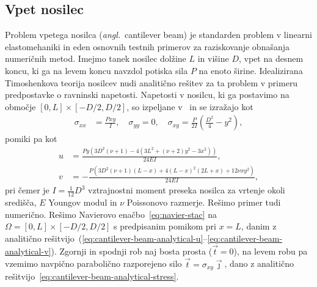\documentclass[12pt,a4paper,twoside]{article}
\theoremstyle{definition} %
\theoremstyle{plain} %
\numberwithin{equation}{section}
\newcommand{\vt}{\vec{t}}
\newcommand{\vj}{\vec{\jmath}}
\newcommand{\ts}{\sigma}
\newcommand{\ang}[1]{(\hspace{-1.5px}\textit{angl.}\ #1)}
\begin{document}
\subsection{Vpet nosilec}
Problem vpetega nosilca \ang{cantilever beam} je standarden problem v linearni elastomehaniki in eden
osnovnih testnih primerov za raziskovanje obnašanja numeričnih metod. Imejmo tanek nosilec dolžine
$L$ in višine $D$, vpet na desnem koncu, ki ga na levem koncu navzdol potiska sila $P$ na enoto
širine. Idealizirana Timoshenkova teorija nosilcev nudi analitično rešitev za ta problem v primeru
predpostavke o ravninski napetosti. Napetosti v nosilcu, ki ga postavimo na območje $[0, L]
\times [-D/2, D/2]$, so izpeljane v~\cite[str.\ 284--289, enačba 7.4.55]{slaughter2012linearized} in
se izražajo kot
\begin{align}
  \ts_{xx} &= \frac{Pxy}{I}, \quad \ts_{yy} = 0, \quad \ts_{xy} = \frac{P}{2I} \left( \frac{D^2}{4}
  - y^2 \right),
  \label{eq:cantilever-beam-analytical-stress}
\end{align}
pomiki pa kot
\begin{align}
  u &= \frac{P y \left(3 D^2 (\nu +1)-4 \left(3 L^2+(\nu +2) y^2-3 x^2\right)\right)}{24 E I},
  \label{eq:cantilever-beam-analytical-u} \\
  v &= -\frac{P \left(3 D^2 (\nu +1) (L-x)+4 (L-x)^2 (2 L+x)+12 \nu  x y^2\right)}{24 E I}, \label{eq:cantilever-beam-analytical-v}
\end{align}
pri čemer je $I = \frac{1}{12} D^3$ vztrajnostni moment preseka nosilca za vrtenje okoli središča,
$E$ Youngov modul in $\nu$ Poissonovo razmerje. Rešimo primer tudi numerično. Rešimo Navierovo
enačbo~\eqref{eq:navier-stac} na $\Omega = [0, L] \times [-D/2, D/2]$ s predpisanim pomikom pri $x =
L$, danim z analitično
rešitvijo~(\ref{eq:cantilever-beam-analytical-u}--\ref{eq:cantilever-beam-analytical-v}). Zgornji
in spodnji rob naj bosta prosta ($\vt = 0$), na levem robu pa vzemimo navpično parabolično
razporejeno silo $\vt = \ts_{xy}\vj$, dano z analitično
rešitvijo~\eqref{eq:cantilever-beam-analytical-stress}.
\end{document}

